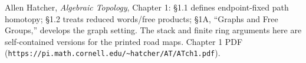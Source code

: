 Allen Hatcher, \emph{Algebraic Topology}, Chapter 1: \S{}1.1 defines endpoint-fixed path homotopy; \S{}1.2 treats reduced words/free products; \S{}1A, ``Graphs and Free Groups,'' develops the graph setting. The stack and finite ring arguments here are self-contained versions for the printed road maps. Chapter 1 PDF (\texttt{https://pi.math.cornell.edu/\~{}hatcher/AT/ATch1.pdf}).
